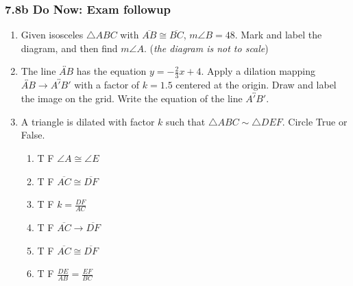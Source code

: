 \documentclass[12pt, twoside]{article}
\begin{document}
\subsubsection*{7.8b Do Now: Exam followup}
  \begin{enumerate}

  \item Given isosceles $\triangle ABC$ with $\overline{AB} \cong \overline{BC}$, $m\angle B = 48$. Mark and label the diagram, and then find $m\angle A$. \hfill (\emph{the diagram is not to scale})
    \begin{flushright}
    \end{flushright}
    
  \item The line $\overleftrightarrow{AB}$ has the equation $y=-\frac{2}{3}x+4$. Apply a dilation mapping $\overleftrightarrow{AB} \rightarrow \overleftrightarrow{A'B'}$ with a factor of $k=1.5$ centered at the origin. Draw and label the image on the grid. Write the equation of the line $\overleftrightarrow{A'B'}$.
    \begin{flushright} %
    \end{flushright}

    \item A triangle is dilated with factor $k$ such that $\triangle ABC \sim \triangle DEF$. Circle True or False.
    \begin{enumerate}[itemsep=0.5cm]
      \item T \quad F \quad $\angle A \cong \angle E$
      \item T \quad F \quad $\overline{AC} \cong \overline{DF}$
      \item T \quad F \quad $\displaystyle k=\frac{DF}{AC}$
      \item T \quad F \quad $\overline{AC} \rightarrow \overline{DF}$
      \item T \quad F \quad $\overline{AC} \cong \overline{DF}$
      \item T \quad F \quad $\displaystyle \frac{DE}{AB} = \frac{EF}{BC}$
    \end{enumerate}


\end{enumerate}
\end{document}
